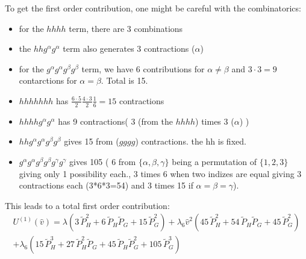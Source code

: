 % 
% 
To get the first order contribution, one might be careful with the combinatorics:
\begin{itemize}
 \item for the $hhhh$ term, there are 3 combinations
 \item the $hhg^{\alpha}g^{\alpha}$ term also generates 3 contractions ($\alpha$)
 \item for the $g^{\alpha}g^{\alpha}g^{\beta}g^{\beta}$ term, we have 6 contributions for $\alpha \neq \beta$ and $3\cdot3=9$ contarctions for $\alpha=\beta$. Total is 15.
 \item $hhhhhhh$ has $\frac{6\cdot5}{2}\frac{4\cdot3}{2}\frac{1}{6}=15$ contractions
 \item $hhhhg^{\alpha}g^{\alpha}$ has 9 contractions( 3 (from the $hhhh$) times 3 ($\alpha$) )
 \item $hhg^{\alpha}g^{\alpha}g^{\beta}g^{\beta}$ gives 15 from ($gggg$) contractions. the hh is fixed.
 \item $g^{\alpha}g^{\alpha}g^{\beta}g^{\beta}g^{\gamma}g^{\gamma}$ gives  105 ( 6 from $\{\alpha,\beta,\gamma\}$ being a permutation of $\{1,2,3\}$ 
        giving only 1 possibility each., 3 times 6 when two indizes are equal giving 3 contractions each (3*6*3=54) and 3 times 15 if $\alpha=\beta=\gamma$).
\end{itemize}
This leads to a total first order contribution:
\begin{multline}
             \label{eq:CEP_improved_inBrokenPhase_1st}
U^{(1)}(\hat v)  = \lambda \left ( 3 \, \tilde P_H^2 + 6 \, \tilde P_H \tilde P_G + 15 \, \tilde P_G^2 \right)   
                 + \lambda_6 \hat v^2 \left ( 45 \, \tilde P_H^2 + 54 \, \tilde P_H \tilde P_G + 45 \, \tilde P_G^2 \right)  \\
                 + \lambda_6 \left( 15 \, \tilde P_H^3 + 27 \, \tilde P_H^2 \tilde P_G + 45 \, \tilde P_H \tilde P_G^2 + 105 \, \tilde P_G^3 \right)
\end{multline}

